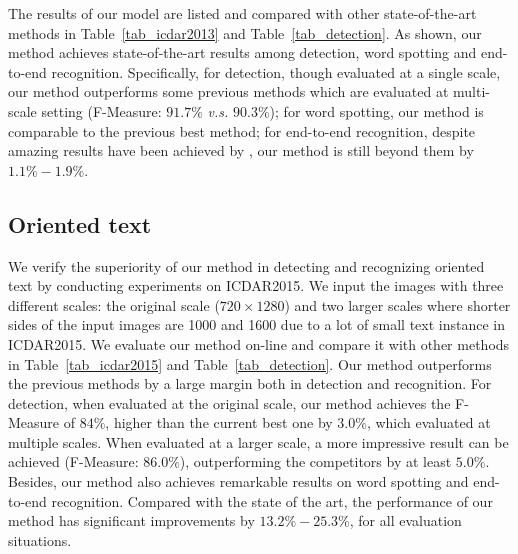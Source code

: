 \documentclass[runningheads]{llncs}
\begin{document}
The results of our model are listed and compared with other state-of-the-art methods in Table~\ref{tab_icdar2013} and Table~\ref{tab_detection}. As shown, our method achieves state-of-the-art results among detection, word spotting and end-to-end recognition. Specifically, for detection, though evaluated at a single scale, our method outperforms some previous methods which are evaluated at multi-scale setting \cite{hu2017wordsup,he2017deep} (F-Measure: $91.7\%$  \emph{v.s.}  $90.3\%$); for word spotting, our method is  comparable to the previous best method; for end-to-end recognition,  despite  amazing results have been achieved by \cite{liao2017textboxes,Li_2017_ICCV}, our method is still beyond them by $1.1\%-1.9\%$.

\subsection{Oriented text}
We verify the superiority of our method in detecting and recognizing oriented text by conducting experiments on ICDAR2015. We input the images with three different scales: the original scale ($720 \times 1280$) and two larger scales where shorter sides of the input images are 1000 and 1600 due to a lot of small text instance in ICDAR2015.  We evaluate our method on-line and compare it  with other methods in Table~\ref{tab_icdar2015} and Table~\ref{tab_detection}. Our method outperforms the previous methods by a large margin both in detection and recognition. For detection, when evaluated at the original scale, our method achieves the F-Measure of $84\%$, higher than the current best one \cite{he2017deep}  by $3.0\%$, which evaluated at multiple scales. When evaluated at a larger scale, a more impressive result can be achieved (F-Measure: $86.0\%$), outperforming the competitors by at least $5.0\%$. Besides, our method also achieves remarkable results on word spotting and end-to-end recognition. Compared with the state of the art, the performance of our method has significant improvements by $13.2\%-25.3\%$, for all evaluation situations.
\end{document}
